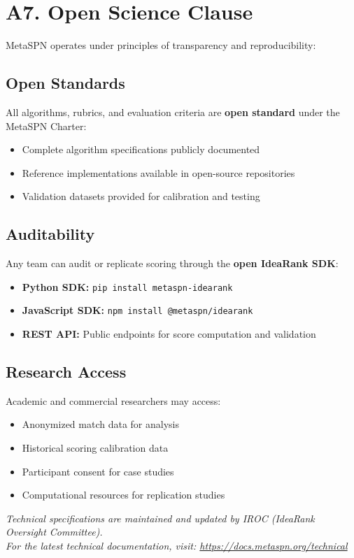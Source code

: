 \section{A7. Open Science Clause}

MetaSPN operates under principles of transparency and reproducibility:

\subsection{Open Standards}

All algorithms, rubrics, and evaluation criteria are \textbf{open standard} under the MetaSPN Charter:
\begin{itemize}[leftmargin=*]
  \item Complete algorithm specifications publicly documented
  \item Reference implementations available in open-source repositories
  \item Validation datasets provided for calibration and testing
\end{itemize}

\subsection{Auditability}

Any team can audit or replicate scoring through the \textbf{open IdeaRank SDK}:
\begin{itemize}[leftmargin=*]
  \item \textbf{Python SDK:} \texttt{pip install metaspn-idearank}
  \item \textbf{JavaScript SDK:} \texttt{npm install @metaspn/idearank}
  \item \textbf{REST API:} Public endpoints for score computation and validation
\end{itemize}

\subsection{Research Access}

Academic and commercial researchers may access:
\begin{itemize}[leftmargin=*]
  \item Anonymized match data for analysis
  \item Historical scoring calibration data
  \item Participant consent for case studies
  \item Computational resources for replication studies
\end{itemize}

\vspace{1em}

\begin{center}
\textit{Technical specifications are maintained and updated by IROC (IdeaRank Oversight Committee).\\
For the latest technical documentation, visit: \url{https://docs.metaspn.org/technical}}
\end{center}

